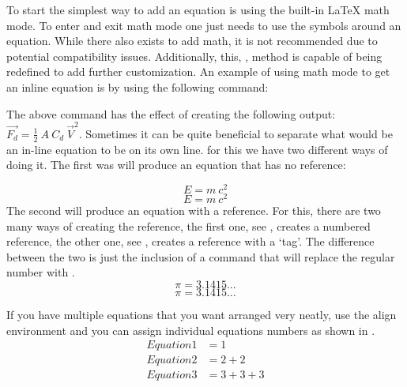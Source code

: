   To start the simplest way to add an equation is using the built-in \LaTeX{} math mode. 
  To enter and exit math mode one just needs to use the  symbols around an equation. While there also exists  to add math, it is not recommended due to potential compatibility issues. Additionally, this, , method is capable of being redefined to add further customization. 
  An example of using math mode to get an inline equation is by using the following command:
  
  {\begin{Center}\end{Center}}
  
  The above command has the effect of creating the following output: \(\vec{F_{d}}=\frac{1}{2}\ A\ C_{d}\ \vec{V}^{2}\).
  Sometimes it can be quite beneficial to separate what would be an in-line equation to be on its own line. for this we have two different ways of doing it. The first was will produce an equation that has no reference:
  
  \[
    E = m\ c^2
  \] %
  \begin{equation*}
    E = m\ c^2
  \end{equation*}
  The second will produce an equation with a reference. For this, there are two many ways of creating the reference, the first one, see , creates a numbered reference, the other one, see , creates a reference with a `tag'. The difference between the two is just the inclusion of a  command that will replace the regular number with .
  \begin{equation}\label{eq:Eq}
    \pi = 3.1415...
  \end{equation}
  \begin{equation}\tag{Constant pi}\label{eq:customTag}
    \pi = 3.1415...
  \end{equation}
  
  If you have multiple equations that you want arranged very neatly, use the align environment and you can assign individual equations numbers as shown in .
  \begin{align}%
    \label{eq:multiref:a} Equation1 & = 1\\
    \label{eq:multiref:b} Equation2 & = 2 + 2\\
    \label{eq:multiref:c} Equation3 & = 3 + 3 + 3
  \end{align}
  

